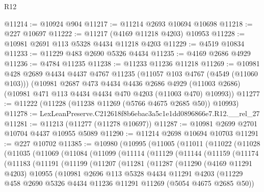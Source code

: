 \begin{lexlean}{R12}
\begin{coremodule}
@11214 := @10924 @904
@11217 := @11214 @2693 @10694 @10698
@11218 := @227 @10697
@11222 := @11217 (@4169 @11218 @4203) @10953
@11228 := @10981 @2691 @113 @5328 @4434 @11218 @4203
@11229 := @4519 @10834
@11233 := @11229 @483 @2690 @5326 @4434
@11235 := @4169 @2686 @4929
@11236 := @4784 @11235
@11238 := @11233 @11236 @11218
@11269 := @10981
    @428
    @2689
    @4434
    @4437
    @4767
    @11235
    (@11057 @103 @4767 (@4549 (@11060 @103)))
    (@10981
      @2687
      @473
      @4434
      @4436
      @2686
      @4929
      (@11003 @2686)
      (@10981 @471 @113 @4434 @4434 @470 @4203 (@11003 @470) @10993))
@11277 := @11222 (@11228 (@11238 @11269 (@5766 @4675 @2685 @50)) @10993)
@11278 := LexLeanPreserve.C212618f8b6ebac3a5c1e1dd0896866e7.R12.__rel_27
@11281 := @11213 (@11277 (@11278 @10697))
@11287 := @10981 @2699 @2701 @10704 @4437 @10955 @5089
@11290 := @11214 @2698 @10694 @10703
@11291 := @227 @10702
@11385 := @10980
    (@10995
      (@11005
        (@11011
          (@11022
            (@11028
              (@11035
                (@11069
                  (@11084
                    (@11099
                      (@11114
                        (@11129
                          (@11144
                            (@11159
                              (@11174
                                (@11183
                                  (@11191
                                    (@11199
                                      (@11207
                                        (@11281
                                          (@11287
                                            (@11290
                                              (@4169 @11291 @4203)
                                              @10955
                                              (@10981
                                                @2696
                                                @113
                                                @5328
                                                @4434
                                                @11291
                                                @4203
                                                (@11229
                                                  @458
                                                  @2690
                                                  @5326
                                                  @4434
                                                  @11236
                                                  @11291
                                                  @11269
                                                  (@5054 @4675 @2685 @50))

\end{coremodule}
\end{lexlean}
